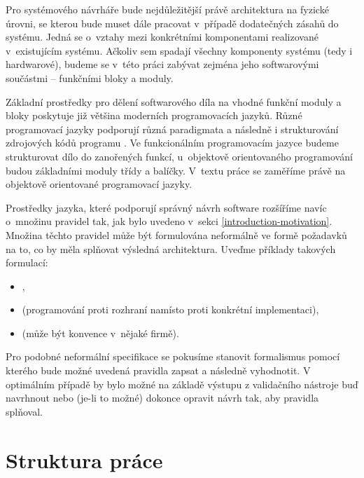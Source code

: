 Pro systémového návrháře bude nejdůležitější právě architektura na fyzické úrovni, se kterou bude muset dále pracovat v~případě dodatečných zásahů do systému. Jedná se o~vztahy mezi konkrétními komponentami realizované v~existujícím systému. Ačkoliv sem spadají všechny komponenty systému (tedy i hardwarové), budeme se v~této práci zabývat zejména jeho softwarovými součástmi -- funkčními bloky a moduly.

Základní prostředky pro dělení softwarového díla na vhodné funkční moduly a bloky poskytuje již většina moderních programovacích jazyků. Různé programovací jazyky podporují různá paradigmata a následně i strukturování zdrojových kódů programu \cite{wiki:programming_paradigm}. Ve funkcionálním programovacím jazyce budeme strukturovat dílo do zanořených funkcí, u~objektově orientovaného programování budou základními moduly třídy a balíčky. V~textu práce se zaměříme právě na objektově orientované programovací jazyky.

Prostředky jazyka, které podporují správný návrh software rozšíříme navíc o~množinu pravidel tak, jak bylo uvedeno v~sekci \ref{introduction-motivation}. Množina těchto pravidel může být formulována neformálně ve formě požadavků na to, co by měla splňovat výsledná architektura. Uveďme příklady takových formulací:

\begin{itemize}
\item {},
\item {} (programování proti rozhraní namísto proti konkrétní implementaci),
\item {} (může být konvence v~nějaké firmě).
\end{itemize}

Pro podobné neformální specifikace se pokusíme stanovit formalismus pomocí kterého bude možné uvedená pravidla zapsat a následně vyhodnotit. V optimálním případě by bylo možné na základě výstupu z validačního nástroje buď navrhnout nebo (je-li to možné) dokonce opravit návrh tak, aby pravidla splňoval.

\section{Struktura práce}

